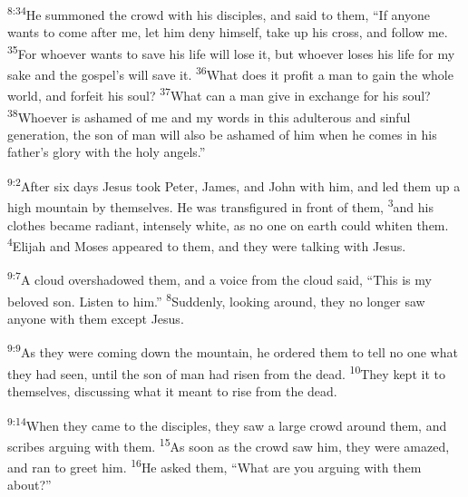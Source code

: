 \documentclass[openany,12pt,english]{book}
\newenvironment{para}{\par\pretolerance=100\tolerance=200\setlength{\emergencystretch}{0.6em}\relax}{\par}
\begin{document}
\begin{para}
    \textsuperscript{8:34}\thinspace{}He summoned the crowd with his disciples, and said to them, “If any\-one wants to come af\-ter me, let him de\-ny him\-self, take up his cross, and fol\-low me.
    \textsuperscript{35}\thinspace{}For who\-ev\-er wants to save his life will lose it, but who\-ev\-er loses his life for my sa\-ke and the gospel's will save it.
    \textsuperscript{36}\thinspace{}What does it prof\-it a man to gain the whole world, and for\-feit his soul?
    \textsuperscript{37}\thinspace{}What can a man give in ex\-change for his soul?
    \textsuperscript{38}\thinspace{}Who\-ev\-er is a\-shamed of me and my words in this a\-dul\-ter\-ous and sin\-ful gen\-er\-a\-tion, the son of man will al\-so be a\-shamed of him when he co\-mes in his father's glo\-ry with the ho\-ly angels.”
\end{para}

\bigskip{}

\begin{para}
    \textsuperscript{9:2}\thinspace{}Af\-ter six days Jesus took Pe\-ter, James, and John with him, and led them up a high moun\-tain by them\-selves. He was transfigured in front of them,
    \textsuperscript{3}\thinspace{}and his clothes be\-came ra\-di\-ant, in\-tense\-ly white, as no one on earth could whit\-en them.
    \textsuperscript{4}\thinspace{}Elijah and Mo\-ses appeared to them, and they were talking with Jesus.
\end{para}

\begin{para}
    \textsuperscript{9:7}\thinspace{}A cloud overshadowed them, and a voice from the cloud said, “This is my be\-lov\-ed son. Lis\-ten to him.”
    \textsuperscript{8}\thinspace{}Sud\-den\-ly, looking a\-round, they no long\-er saw any\-one with them ex\-cept Jesus.
\end{para}

\begin{para}
    \textsuperscript{9:9}\thinspace{}As they were com\-ing down the moun\-tain, he ordered them to tell no one what they had seen, un\-til the son of man had ris\-en from the dead.
    \textsuperscript{10}\thinspace{}They kept it to them\-selves, discussing what it meant to rise from the dead.
\end{para}

\bigskip{}

\begin{para}
    \textsuperscript{9:14}\thinspace{}When they came to the disciples, they saw a large crowd a\-round them, and scribes ar\-gu\-ing with them.
    \textsuperscript{15}\thinspace{}As soon as the crowd saw him, they were a\-mazed, and ran to greet him.
    \textsuperscript{16}\thinspace{}He asked them, “What are you ar\-gu\-ing with them a\-bout?”
\end{para}
\end{document}
